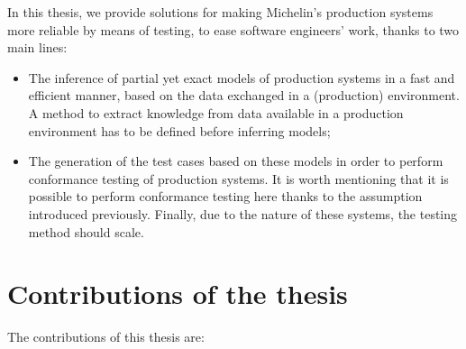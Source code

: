 In this thesis, we provide solutions for making Michelin's
production systems more reliable by means of testing, to ease
software engineers' work, thanks to two main lines:

\begin{itemize}
    \item The inference of partial yet exact models of production
        systems in a fast and efficient manner, based on the data
        exchanged in a (production) environment. A method to
        extract knowledge from data available in a production
        environment has to be defined before inferring models;

    \item The generation of the test cases based on these models
        in order to perform conformance testing of production
        systems. It is worth mentioning that it is possible to
        perform conformance testing here thanks to the assumption
        introduced previously. Finally, due to the nature of
        these systems, the testing method should scale.
\end{itemize}


\section{Contributions of the thesis}
\label{sec:intro:contrib}

The contributions of this thesis are:

